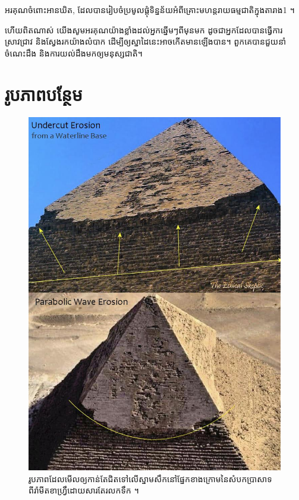 \documentclass[10pt,twocolumn,letterpaper]{article}
\begin{document}
អរគុណចំពោះអានឃិត, ដែលបានរៀបចំប្រមូលផ្ដុំទិន្នន័យអំពីគ្រោះមហន្តរាយធម្មជាតិក្នុងតារាង1 ។

ហើយពិតណាស់ យើងសូមអរគុណយ៉ាងខ្លាំងដល់អ្នកឆ្នើមៗពីមុនមក ដូចជាអ្នកដែលបានធ្វើការស្រាវជ្រាវ និងស្វែងរកយ៉ាងលំបាក ដើម្បីឲ្យស្នាដៃនេះអាចកើតមានឡើងបាន។ ពួកគេបានជួយនាំចំណេះដឹង និងការយល់ដឹងមកឲ្យមនុស្សជាតិ។

\clearpage
\twocolumn

\clearpage
\twocolumn

\clearpage
\twocolumn

\section{រូបភាពបន្ថែម}

\begin{figure}[b]
\begin{center}
   \includegraphics[width=1\linewidth]{wave.jpg}
\end{center}
   \caption{រូបភាពដែលមើលឲ្យកាន់តែជិតទៅលើស្នាមសឹកនៅផ្នែកខាងក្រោមនៃសំបកប្រាសាទពីរ៉ាមីតខាហ្វ្រឹដោយសារតែរលកទឹក \cite{27}។}
\label{fig:19}
\label{fig:onecol}
\end{figure}
\end{document}
